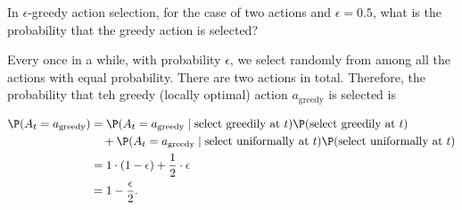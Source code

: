 
\begin{exercise}[Exercise 2.1]

In $\epsilon$-greedy action selection, for the case of two actions and $\epsilon = 0.5$, what is the probability that the greedy action is selected?

\end{exercise}


\begin{solution}

Every once in a while, with probability $\epsilon$, we select randomly from among all the actions with equal probability.
There are two actions in total.
Therefore, the probability that teh greedy (locally optimal) action $a_\text{greedy}$ is selected is

\begin{align*}
    \P(A_t = a_\text{greedy})
    & =
    \P(A_t = a_\text{greedy} \mid \text{select greedily at $t$}) \P(\text{select greedily at $t$}) \\
    & \quad +
    \P(A_t = a_\text{greedy} \mid \text{select uniformally at $t$}) \P(\text{select uniformally at $t$}) \\
    & =
    1 \cdot (1 - \epsilon) + \frac{1}{2} \cdot \epsilon \\
    & =
    1 - \frac{\epsilon}{2}.
\end{align*}

\end{solution}

